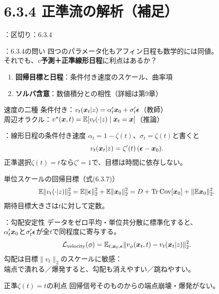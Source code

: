 \section{6.3.4 正準流の解析（補足）}
\assuppl
\begin{frame}{\supplmark：区切り：6.3.4}
    \tableofcontents[currentsection]
\end{frame}
\assuppl
\begin{frame}{\supplmark：6.3.4の問い}
    四つのパラメータ化もアフィン日程も数学的には同値。\\
    それでも、\textbf{$v$予測＋正準線形日程}に利点はあるか？
    \begin{enumerate}
        \item \textbf{回帰目標と日程}：条件付き速度のスケール、曲率項
        \item \textbf{ソルバ含意}：数値積分との相性（詳細は第9章）
    \end{enumerate}
    \begin{exampleblock}{速度の二種}
        条件付き：$v_t(\bm{x}_t|z)=\alpha_t'\bm{x}_0+\sigma_t'\bm{\epsilon}$（教師）\\
        周辺オラクル：$v^\star(\bm{x},t)=\mathbb{E}[v_t(\cdot|z)\mid\bm{x}_t=\bm{x}]$（推論）
    \end{exampleblock}
\end{frame}
\assuppl
\begin{frame}{\supplmark：線形日程の条件付き速度}
    $\alpha_t=1-\zeta(t)$、$\sigma_t=\zeta(t)$と書くと
    \[
        v_t(\bm{x}_t|z)=\zeta'(t)\,(\bm{\epsilon}-\bm{x}_0).
    \]
    正準選択$\zeta(t)=t$なら$\zeta'=1$で、目標は時間に依存しない。
    \begin{block}{単位スケールの回帰目標（式(6.3.7)）}
        \[
            \mathbb{E}\|v_t(\cdot|z)\|_{2}^{2}
            =
            \mathbb{E}\|\bm{\epsilon}\|_{2}^{2}+\mathbb{E}\|\bm{x}_0\|_{2}^{2}
            =
            D+\mathrm{Tr}\,\mathrm{Cov}[\bm{x}_0]+\|\mathbb{E}\bm{x}_0\|_{2}^{2}.
        \]
        期待目標大きさは$t$に対して定数。
    \end{block}
\end{frame}
\assuppl
\begin{frame}{\supplmark：勾配安定性}
    データをゼロ平均・単位共分散に標準化すると、\\
    $\alpha_t'\bm{x}_0$と$\sigma_t'\bm{\epsilon}$が全$t$で同程度に寄与する。
    \[
        \mathcal{L}_{\mathrm{velocity}}(\phi)
        =
        \mathbb{E}_{t,\bm{x}_0,\bm{\epsilon}}
        \|v_\phi(\bm{x}_t,t)-v_t(\bm{x}_t|z)\|_{2}^{2}.
    \]
    勾配は目標$\|v_t\|_{2}$のスケールに敏感：\\
    端点で潰れる／爆発すると、勾配も消えやすい／跳ねやすい。
    \begin{exampleblock}{正準$\zeta(t)=t$の利点}
        回帰信号そのものからの端点崩壊・爆発がない。
    \end{exampleblock}
\end{frame}
